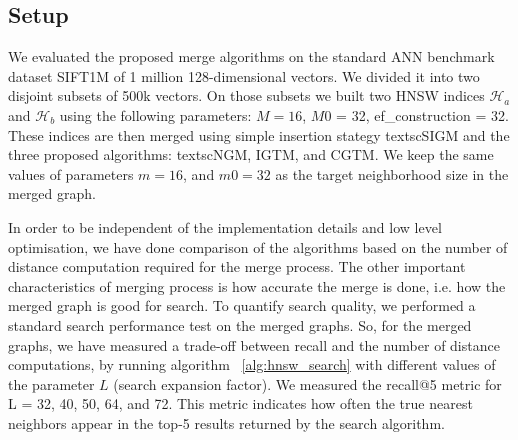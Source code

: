 \documentclass{article}
\begin{document}


\subsection{Setup}

We evaluated the proposed merge algorithms on the standard ANN benchmark dataset SIFT1M of 1 million 128-dimensional vectors. We divided it into two disjoint subsets of 500k vectors. On those subsets we built two HNSW indices $\mathcal{H}_a$ and $\mathcal{H}_b$ using the following parameters: $M = 16$, $M0$ = 32, ef\_construction = 32.
These indices are then merged using simple insertion stategy textsc{SIGM} and the three proposed algorithms: textsc{NGM}, \textsc{IGTM}, and \textsc{CGTM}. We keep the same values of parameters $m = 16$, and $m0 = 32$  as the target neighborhood size in the merged graph.

In order to be independent of the implementation details and low level optimisation, we have done comparison of the algorithms based on the number of distance computation required for the merge process. The other important characteristics of merging process is how accurate the merge is done, i.e. how the merged graph is good for search. To quantify search quality, we performed a standard search performance test on the merged graphs. So, for the merged graphs, we have measured a trade-off between recall and the number of distance computations, by running algorithm ~\ref{alg:hnsw_search} with different values of the parameter $L$ (search expansion factor). We measured the recall@5 metric for L = 32, 40, 50, 64, and 72. This metric indicates how often the true nearest neighbors appear in the top-5 results returned by the search algorithm.
\end{document}
